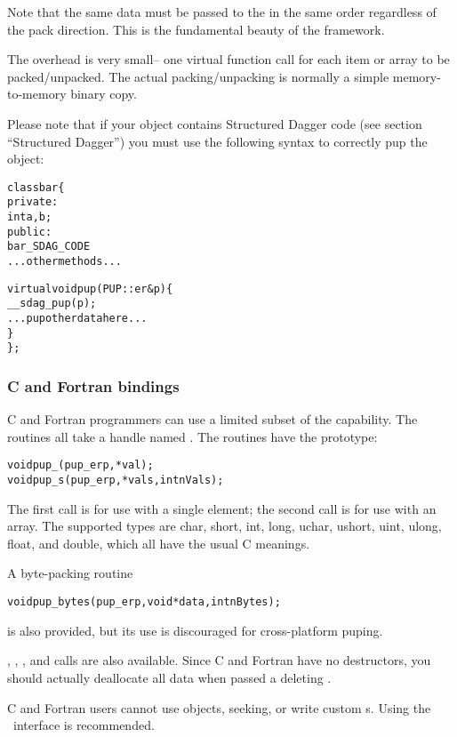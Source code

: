 Note that the same data must be passed to the  
in the same order regardless of the pack direction.
This is the fundamental beauty of the  framework.

The  overhead is very small-- one virtual function call
for each item or array to be packed/unpacked.  The actual packing/unpacking is
normally a simple memory-to-memory binary copy. 

Please note that if your object contains Structured Dagger code (see section ``Structured Dagger'') you must use the following syntax to correctly pup the object:

\begin{alltt}
class bar \{
 private:
    int a,b;
 public:
    bar_SDAG_CODE 
    ...other methods...

    virtual void pup(PUP::er& p) \{
      __sdag_pup(p);
      ...pup other data here...
    \}
\};
\end{alltt}


\subsubsection{C and Fortran bindings}
C and Fortran programmers can use a limited subset of the
 capability.  The routines all take a 
handle named .  The routines 
have the prototype:
\begin{alltt}
void pup\_(pup\_er p, *val);
void pup\_s(pup\_er p, *vals,int nVals);
\end{alltt}
The first call is for use with a single element;
the second call is for use with an array.
The supported types are char, short, int, long,
uchar, ushort, uint, ulong, float, and double,
which all have the usual C meanings.

A byte-packing routine
\begin{alltt}
void pup\_bytes(pup\_er p,void *data,int nBytes);
\end{alltt}
is also provided, but its use is discouraged
for cross-platform puping.

, , ,
and  calls are also available.
Since C and Fortran have no destructors, you should 
actually deallocate all data when passed a deleting .

C and Fortran users cannot use  objects, 
seeking, or write custom s. Using the \CC\
interface is recommended.

